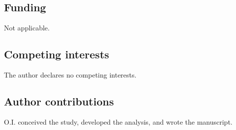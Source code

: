 \documentclass[pdflatex,sn-mathphys-num]{sn-jnl}
\theoremstyle{thmstyleone}
\theoremstyle{thmstyletwo}
\theoremstyle{thmstylethree}
\begin{document}

        \subsection*{Funding}
            Not applicable.

        \subsection*{Competing interests}
            The author declares no competing interests.

        \subsection*{Author contributions}
            O.I. conceived the study, developed the analysis, and wrote the manuscript.

            
\end{document}
